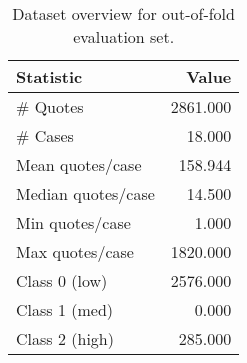 \begin{table}
\caption{Dataset overview for out-of-fold evaluation set.}
\label{tab:dataset-summary}
\begin{tabular}{lr}
\toprule
Statistic & Value \\
\midrule
\# Quotes & 2861.000 \\
\# Cases & 18.000 \\
Mean quotes/case & 158.944 \\
Median quotes/case & 14.500 \\
Min quotes/case & 1.000 \\
Max quotes/case & 1820.000 \\
Class 0 (low) & 2576.000 \\
Class 1 (med) & 0.000 \\
Class 2 (high) & 285.000 \\
\bottomrule
\end{tabular}
\end{table}
